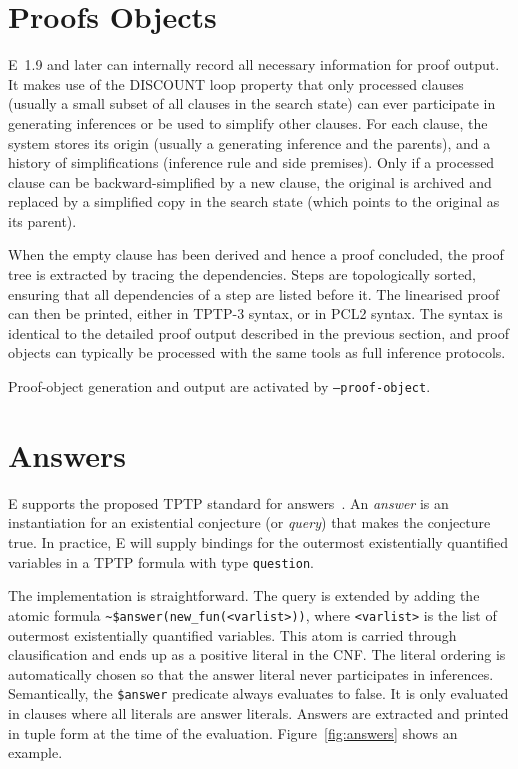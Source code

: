 \documentclass{report}
\begin{document}
\section{Proofs Objects}

E~1.9 and later can internally record all necessary information for
proof output. It makes use of the DISCOUNT loop property that only
processed clauses (usually a small subset of all clauses in the search
state) can ever participate in generating inferences or be used to
simplify other clauses. For each clause, the system stores its origin
(usually a generating inference and the parents), and a history of
simplifications (inference rule and side premises). Only if a
processed clause can be backward-simplified by a new clause, the
original is archived and replaced by a simplified copy in the search
state (which points to the original as its parent).

When the empty clause has been derived and hence a proof concluded,
the proof tree is extracted by tracing the dependencies. Steps are
topologically sorted, ensuring that all dependencies of a step are
listed before it. The linearised proof can then be printed, either in
TPTP-3 syntax, or in PCL2 syntax. The syntax is identical to the
detailed proof output described in the previous section, and proof
objects can typically be processed with the same tools as full
inference protocols.

Proof-object generation and output are activated by
\texttt{--proof-object}.


\section{Answers}

E supports the proposed TPTP standard for
answers~\cite{SSSU:TPTP-ANS}. An \emph{answer} is an instantiation for
an existential conjecture (or \emph{query}) that makes the conjecture
true. In practice, E will supply bindings for the outermost
existentially quantified variables in a TPTP formula with type
\texttt{question}.

The implementation is straightforward. The query is extended by adding
the atomic formula \verb|~$answer(new_fun(<varlist>))|, where
\verb|<varlist>| is the list of outermost existentially quantified
variables. This atom is carried through clausification and ends up as
a positive literal in the CNF. The literal ordering is automatically
chosen so that the answer literal never participates in
inferences. Semantically, the \verb|$answer| predicate always
evaluates to false. It is only evaluated in clauses where all literals
are answer literals. Answers are extracted and printed in tuple form
at the time of the evaluation. Figure~\ref{fig:answers} shows an
example.
\end{document}
